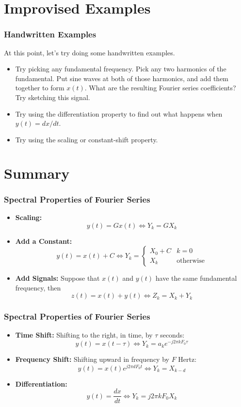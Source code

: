 \documentclass{beamer}
\begin{document}
\section[Examples]{Improvised Examples}
\setcounter{subsection}{1}

\begin{frame}
  \frametitle{Handwritten Examples}

  At this point, let's try doing some handwritten examples.
  \begin{itemize}
  \item Try picking any fundamental frequency.  Pick any two harmonics
    of the fundamental.  Put sine waves at both of those harmonics,
    and add them together to form $x(t)$.  What are the resulting
    Fourier series coefficients?  Try sketching this signal.
  \item Try using the differentiation property to find out what happens when $y(t)=dx/dt$.
  \item Try using the scaling or constant-shift property.
  \end{itemize}
\end{frame}

\section[Summary]{Summary}
\setcounter{subsection}{1}

\begin{frame}
  \frametitle{Spectral Properties of Fourier Series}
  \begin{itemize}
  \item {\bf Scaling:}
    \[
    y(t) = Gx(t)\Leftrightarrow Y_k = GX_k
    \]
  \item {\bf Add a Constant:}
    \[
    y(t)=x(t)+C \Leftrightarrow
    Y_k = \begin{cases}
      X_0+C & k=0 \\
      X_k & \mbox{otherwise}
    \end{cases}
    \]
  \item {\bf Add Signals:} Suppose that $x(t)$ and $y(t)$ have the
    same fundamental frequency, then
    \[
    z(t)=x(t)+y(t)
    \Leftrightarrow
    Z_k = X_k+Y_k
    \]
  \end{itemize}
\end{frame}  

\begin{frame}
  \frametitle{Spectral Properties of Fourier Series}
  \begin{itemize}
  \item {\bf Time Shift:} Shifting to the right, in time, by $\tau$
    seconds:
    \[
    y(t)=x(t-\tau)\Leftrightarrow Y_k= a_k e^{-j2\pi kF_0\tau}
    \]
  \item {\bf Frequency Shift:} Shifting upward in frequency by $F$
    Hertz:
    \[
    y(t)=x(t)e^{j2\pi dF_0t} \Leftrightarrow Y_k= X_{k-d}
    \]
  \item {\bf Differentiation:}
    \[
    y(t) = \frac{dx}{dt} \Leftrightarrow Y_k= j2\pi kF_0 X_k
    \]
  \end{itemize}
\end{frame}  
        
\end{document}
